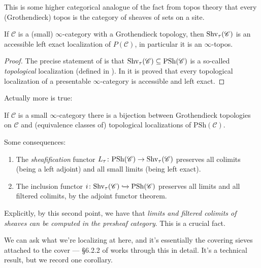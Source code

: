 \documentclass[11pt]{amsart}
\renewcommand{\Pre}{\mathrm{PSh}}
\begin{document}
This is some higher categorical analogue of the fact from topos theory that every (Grothendieck) topos is the category of sheaves of sets on a site.


\begin{proposition} \cite[6.2.2.7]{HTT} If $\mathscr{C}$ is a (small) $\infty$-category with a Grothendieck topology,  then $\mathrm{Shv}_\tau(\mathscr{C})$ is an accessible left exact localization of $P(\mathscr{C})$, in particular it is an $\infty$-topos.
\end{proposition}
\begin{proof} The precise statement of \cite[6.2.2.7]{HTT} is that $\Shv_\tau(\mathscr{C}) \subseteq \Pre(\mathscr{C})$ is a so-called \textit{topological} localization (defined in \cite[6.2.1.4]{HTT}). In \cite[6.2.1.6]{HTT} it is proved that every topological localization of a presentable $\infty$-category is accessible and left exact.
\end{proof}


Actually more is true:

\begin{proposition} \cite[6.2.2.17]{HTT} If $\mathscr{C}$ is a small $\infty$-category there is a bijection between Grothendieck topologies on $\mathscr{C}$ and (equivalence classes of) topological localizations of $\Pre(\mathscr{C})$.
\end{proposition}

\begin{corollary}\label{cor:properties-sheafification} 
Some consequences:
\begin{enumerate}
    \item The \textit{sheafification} functor $L_\tau \colon \Pre(\mathscr{C}) \to \Shv_\tau(\mathscr{C})$ preserves all colimits (being a left adjoint) and all small limits (being left exact).

    \item The inclusion functor $i \colon \Shv_\tau(\mathscr{C}) \hookto \Pre(\mathscr{C})$ preserves all limits and all filtered colimits, by the adjoint functor theorem.
\end{enumerate}
\end{corollary}

Explicitly, by this second point, we have that \textit{limits and filtered colimits of sheaves can be computed in the presheaf category}. This is a crucial fact.

We can ask what we're localizing at here, and it's essentially the covering sieves attached to the cover --- \S6.2.2 of \cite{HTT} works through this in detail. It's a technical result, but we record one corollary.
\end{document}
